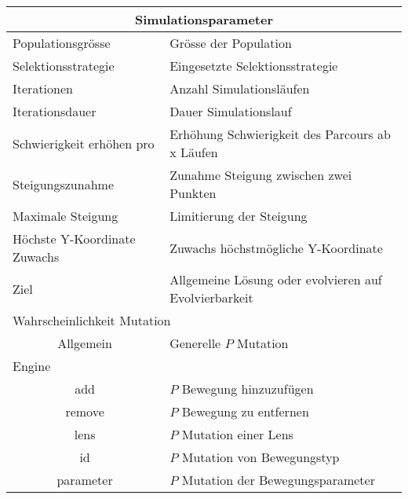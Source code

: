 
\begin{tabular}{ | l | l | }

  \hline
  \multicolumn{2}{|c|}{Simulationsparameter} \\
  \hline
  Populationsgrösse & Grösse der Population \\ \hline
  Selektionsstrategie & Eingesetzte Selektionsstrategie \\ \hline
  Iterationen & Anzahl Simulationsläufen \\ \hline
  Iterationsdauer & Dauer Simulationslauf \\ \hline
  Schwierigkeit erhöhen pro & Erhöhung Schwierigkeit des Parcours ab x Läufen \\ \hline
  Steigungszunahme & Zunahme Steigung zwischen zwei Punkten \\ \hline
  Maximale Steigung & Limitierung der Steigung\\ \hline
  Höchste Y-Koordinate Zuwachs & Zuwachs höchstmögliche Y-Koordinate \\ \hline
  Ziel & Allgemeine Lösung oder evolvieren auf Evolvierbarkeit \\ \hline
  \multicolumn{2}{|l|}{Wahrscheinlichkeit Mutation}\\ \hline
  \multicolumn{1}{|c|}{Allgemein} & Generelle \(P\) Mutation \\ \hline
  Engine &  \\ \hline
  \multicolumn{1}{|c|}{add} & \(P\) Bewegung hinzuzufügen \\ \hline
  \multicolumn{1}{|c|}{remove} & \(P\) Bewegung zu entfernen \\ \hline
  \multicolumn{1}{|c|}{lens} & \(P\) Mutation einer Lens \\ \hline
  \multicolumn{1}{|c|}{id} & \(P\) Mutation von Bewegungstyp\\ \hline
  \multicolumn{1}{|c|}{parameter} & \(P\) Mutation der Bewegungsparameter \\ \hline

\end{tabular}
